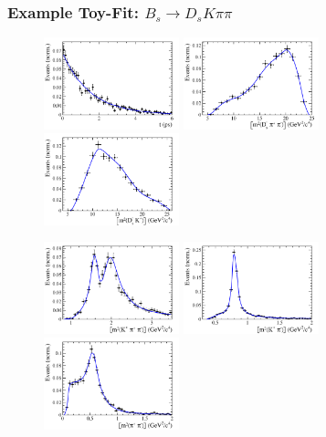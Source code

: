 \documentclass[]{beamer}
\begin{document}
\begin{frame}
	\frametitle{Example Toy-Fit: $B_s \to D_s K \pi \pi$}

	\centering
	
	\begin{figure}[hp]
	\centering
		\includegraphics[width=0.35\textwidth, height = 3.cm]{plots_toys/h_t-eps-converted-to.pdf} 
		\includegraphics[width=0.35\textwidth, height = 3.cm]{plots_toys/s_Dspipi-eps-converted-to.pdf} 
		\includegraphics[width=0.35\textwidth, height = 3.cm]{plots_toys/s_DsK-eps-converted-to.pdf} 

		\includegraphics[width=0.35\textwidth, height = 3.cm]{plots_toys/s_Kpipi-eps-converted-to.pdf} 
		\includegraphics[width=0.35\textwidth, height = 3.cm]{plots_toys/s_Kpi-eps-converted-to.pdf} 
		\includegraphics[width=0.35\textwidth, height = 3.cm]{plots_toys/s_pipi-eps-converted-to.pdf} 		
	\end{figure}				
\end{frame}
\end{document}

